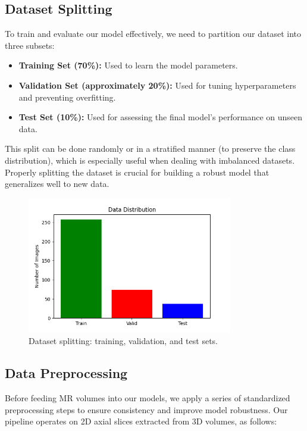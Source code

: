 \subsection{Dataset Splitting}
To train and evaluate our model effectively, we need to partition our dataset into three subsets:
\begin{itemize}
  \item \textbf{Training Set (70\%):} Used to learn the model parameters.
  \item \textbf{Validation Set (approximately 20\%):} Used for tuning hyperparameters and preventing overfitting.
  \item \textbf{Test Set (10\%):} Used for assessing the final model’s performance on unseen data.
\end{itemize}
This split can be done randomly or in a stratified manner (to preserve the class distribution), which is especially useful when dealing with imbalanced datasets. Properly splitting the dataset is crucial for building a robust model that generalizes well to new data.
\begin{figure}[H]
  \centering
  \includegraphics[width=0.8\textwidth]{Images/Chapter3/data_distribution.png}
  \caption{Dataset splitting: training, validation, and test sets.}
  \label{fig:data_distribution}
\end{figure}


\subsection{Data Preprocessing}
\label{sec:contribution-preprocessing}

Before feeding MR volumes into our models, we apply a series of standardized preprocessing steps to ensure consistency and improve model robustness. Our pipeline operates on 2D axial slices extracted from 3D volumes, as follows:

